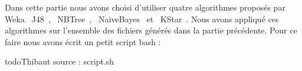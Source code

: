 Dans cette partie nous avons choisi d'utiliser quatre algorithmes proposés par Weka \og~J48~\fg{}, \og~NBTree~\fg{}, \og~NaiveBayes~\fg{} et \og~KStar~\fg{}. Nous avons appliqué ces algorithmes sur l'ensemble des fichiers générés dans la partie précédente. Pour ce faire nous avons écrit un petit script bash :

todo{Thibaut} source : script.sh
